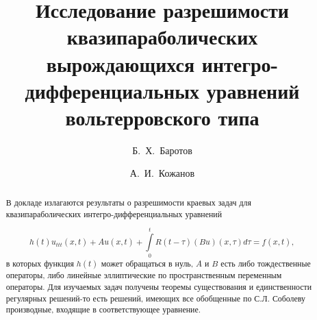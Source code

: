 \usepackage{todonotes} 

\usepackage[russian]{nla}


\fi

\title{Исследование разрешимости квазипараболических вырождающихся интегро-дифференциальных уравнений вольтерровского типа}
\author{Б.~Х.~Баротов  \and А.~И.~Кожанов
}


\maketitle

\begin{abstract}
В докладе излагаются результаты о разрешимости краевых задач для квазипараболических интегро-дифференциальных  уравнений 

	
 $$ h(t)u_{ttt}(x,t)+ Au(x,t) +\int\limits_0^t R(t-\tau) (Bu)(x,\tau)d\tau =f(x,t),  $$
 в которых  функция $h(t)$ может обращаться  в нуль, $A$ и $B$ есть  либо  тождественные  операторы, либо  линейные эллиптические по пространственным  переменным операторы. Для изучаемых задач получены теоремы существования и единственности регулярных решений-то есть решений, имеющих все обобщенные по С.Л. Соболеву производные, входящие в соответствующее уравнение.

\end{abstract}











%

